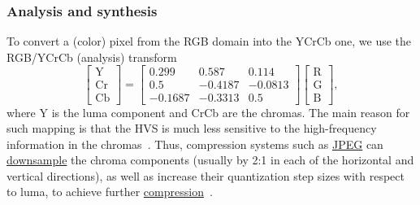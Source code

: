 \subsubsection{Analysis and synthesis}
To convert a (color) pixel from the RGB domain into the YCrCb one, we use
the RGB/YCrCb (analysis) transform~\cite{malvar2008lifting}
\begin{equation}
  \begin{bmatrix}
    \text{Y} \\
    \text{Cr} \\
    \text{Cb}
  \end{bmatrix}
  =
  \begin{bmatrix}
    0.299   &   0.587 & 0.114 \\ 
    0.5     & -0.4187 & -0.0813 \\
    -0.1687 & -0.3313 & 0.5
  \end{bmatrix}
  \begin{bmatrix}
    \text{R} \\
    \text{G} \\
    \text{B}
  \end{bmatrix},
  \label{eq:YCrCb}
\end{equation}
where Y is the luma component and CrCb are the chromas. The main
reason for such mapping is that the HVS is much less sensitive to the
high-frequency information in the
chromas~\cite{burger2016digital}. Thus, compression systems such as
\href{https://en.wikipedia.org/wiki/JPEG}{JPEG} can
\href{https://en.wikipedia.org/wiki/Downsampling_(signal_processing)}{downsample}
the chroma components (usually by 2:1 in each of the horizontal and
vertical directions), as well as increase their quantization step
sizes with respect to luma, to achieve further
\href{https://en.wikipedia.org/wiki/Data_compression_ratio}{compression}~\cite{malvar2008lifting}.

